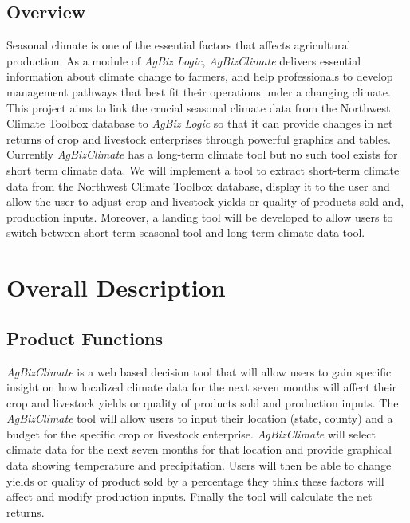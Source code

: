 \documentclass[onecolumn, draftclsnofoot,10pt, compsoc]{article}
\begin{document}
		\subsection{Overview}
			Seasonal climate is one of the essential factors that affects agricultural production. As a module of \textit{AgBiz Logic}, \textit{AgBizClimate} delivers essential information about climate change to farmers, and help professionals to develop management pathways that best fit their operations under a changing climate. This project aims to link the crucial seasonal climate data from the Northwest Climate Toolbox database to \textit{AgBiz Logic} so that it can provide changes in net returns of crop and livestock enterprises through powerful graphics and tables. \\
			Currently \textit{AgBizClimate} has a long-term climate tool but no such tool exists for short term climate data. We will implement a tool to extract short-term climate data from the Northwest Climate Toolbox database, display it to the user and allow the user to adjust crop and livestock yields or quality of products sold and, production inputs. Moreover, a landing tool will be developed to allow users to switch between short-term seasonal tool and long-term climate data tool.\\
\section{Overall Description}
	\subsection {Product Functions}
				\textit{AgBizClimate} is a web based decision tool that will allow users to gain specific insight on how localized climate data for the next seven months will affect their crop and livestock yields or quality of products sold and production inputs. The \textit{AgBizClimate} tool will allow users to input their location (state, county) and a budget for the specific crop or livestock enterprise. \textit{AgBizClimate} will select climate data for the next seven months for that location and provide graphical data showing temperature and precipitation. Users will then be able to change yields or quality of product sold by a percentage they think these factors will affect and modify production inputs. Finally the tool will calculate the net returns.\\
\end{document}
